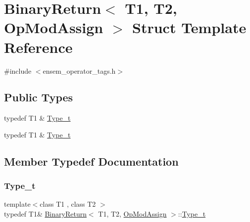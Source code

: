 \hypertarget{structBinaryReturn_3_01T1_00_01T2_00_01OpModAssign_01_4}{}\section{Binary\+Return$<$ T1, T2, Op\+Mod\+Assign $>$ Struct Template Reference}
\label{structBinaryReturn_3_01T1_00_01T2_00_01OpModAssign_01_4}


{\ttfamily \#include $<$ensem\+\_\+operator\+\_\+tags.\+h$>$}

\subsection*{Public Types}
\begin{DoxyCompactItemize}
\item 
typedef T1 \& \mbox{\hyperlink{structBinaryReturn_3_01T1_00_01T2_00_01OpModAssign_01_4_ae184d3c020adc86d2a8e45d393ea778c}{Type\+\_\+t}}
\item 
typedef T1 \& \mbox{\hyperlink{structBinaryReturn_3_01T1_00_01T2_00_01OpModAssign_01_4_ae184d3c020adc86d2a8e45d393ea778c}{Type\+\_\+t}}
\end{DoxyCompactItemize}


\subsection{Member Typedef Documentation}
\mbox{\label{structBinaryReturn_3_01T1_00_01T2_00_01OpModAssign_01_4_ae184d3c020adc86d2a8e45d393ea778c}} 
\subsubsection{\texorpdfstring{Type\_t}{Type\_t}\hspace{0.1cm}{\footnotesize\ttfamily [1/2]}}
{\footnotesize\ttfamily template$<$class T1 , class T2 $>$ \\
typedef T1\& \mbox{\hyperlink{structBinaryReturn}{Binary\+Return}}$<$ T1, T2, \mbox{\hyperlink{structOpModAssign}{Op\+Mod\+Assign}} $>$\+::\mbox{\hyperlink{structBinaryReturn_3_01T1_00_01T2_00_01OpModAssign_01_4_ae184d3c020adc86d2a8e45d393ea778c}{Type\+\_\+t}}}

